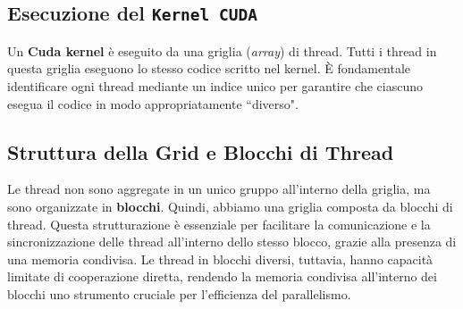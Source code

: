 \subsection{Esecuzione del \texttt{Kernel CUDA}}

Un \textbf{Cuda kernel} è eseguito da una griglia (\textit{array}) di thread.
Tutti i thread in questa griglia eseguono lo stesso codice scritto nel
kernel. È fondamentale identificare ogni thread mediante un indice unico
per garantire che ciascuno esegua il codice in modo appropriatamente ``diverso".

\subsection{Struttura della Grid e Blocchi di Thread}

Le thread non sono aggregate in un unico gruppo all'interno della griglia,
ma sono organizzate in \textbf{blocchi}. Quindi, abbiamo una griglia
composta da blocchi di thread. Questa strutturazione è essenziale
per facilitare la comunicazione e la sincronizzazione delle thread
all'interno dello stesso blocco, grazie alla presenza di una memoria
condivisa. Le thread in blocchi diversi, tuttavia, hanno capacità
limitate di cooperazione diretta, rendendo la memoria condivisa
all'interno dei blocchi uno strumento cruciale per l'efficienza
del parallelismo.


\begin{figure}[H]
  \centering
\end{figure}

